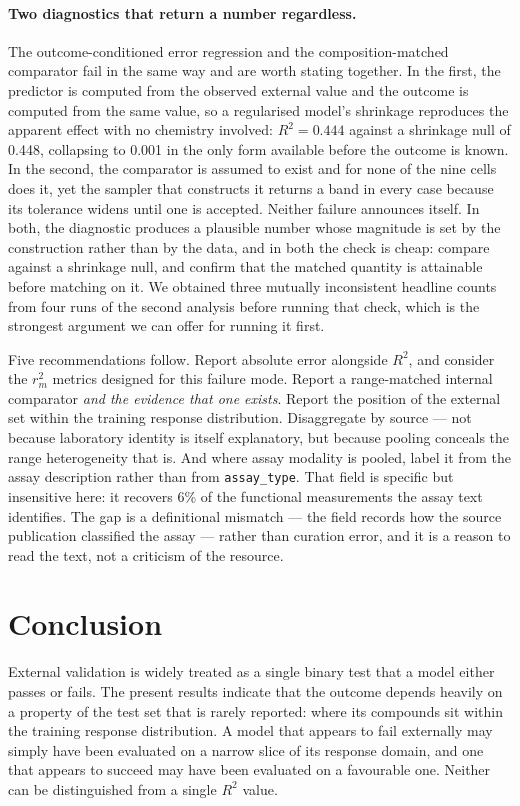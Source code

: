 \documentclass[11pt,a4paper]{article}
\begin{document}
\paragraph{Two diagnostics that return a number regardless.} The outcome-conditioned
error regression and the composition-matched comparator fail in the same way and are
worth stating together. In the first, the predictor is computed from the observed
external value and the outcome is computed from the same value, so a regularised model's
shrinkage reproduces the apparent effect with no chemistry involved: $R^2=0.444$ against
a shrinkage null of 0.448, collapsing to 0.001 in the only form available before the
outcome is known. In the second, the comparator is assumed to exist and for none of the
nine cells does it, yet the sampler that constructs it returns a band in every case
because its tolerance widens until one is accepted. Neither failure announces itself. In
both, the diagnostic produces a plausible number whose magnitude is set by the
construction rather than by the data, and in both the check is cheap: compare against a
shrinkage null, and confirm that the matched quantity is attainable before matching on
it. We obtained three mutually inconsistent headline counts from four runs of the second analysis
before running that check, which is the strongest argument we can offer for running it
first.

Five recommendations follow. Report absolute error alongside $R^2$, and consider the
$r_m^2$ metrics designed for this failure mode.\cite{Roy2009} Report a
range-matched internal comparator \emph{and the evidence that one exists}. Report the
position of the external set within the training response distribution. Disaggregate by
source --- not because laboratory identity is itself explanatory, but because pooling
conceals the range heterogeneity that is. And where assay modality is pooled, label it
from the assay description rather than from \texttt{assay\_type}. That field is specific
but insensitive here: it recovers 6\% of the functional measurements the assay text
identifies. The gap is a definitional mismatch --- the field records how the source
publication classified the assay --- rather than curation error, and it is a reason to
read the text, not a criticism of the resource.

\section{Conclusion}

External validation is widely treated as a single binary test that a model either
passes or fails. The present results indicate that the outcome depends heavily on a
property of the test set that is rarely reported: where its compounds sit within the
training response distribution. A model that appears to fail externally may simply have
been evaluated on a narrow slice of its response domain, and one that appears to
succeed may have been evaluated on a favourable one. Neither can be distinguished from
a single $R^2$ value.
\end{document}

